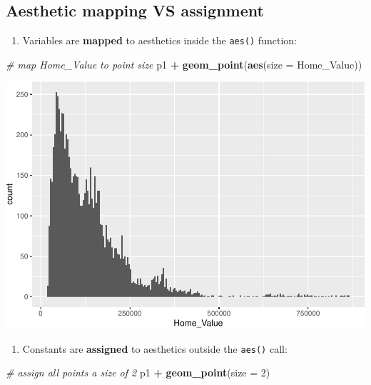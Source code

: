 \documentclass[
]{book}
\newenvironment{Shaded}{\begin{snugshade}}{\end{snugshade}}
\newcommand{\CommentTok}[1]{\textcolor[rgb]{0.56,0.35,0.01}{\textit{#1}}}
\newcommand{\DataTypeTok}[1]{\textcolor[rgb]{0.13,0.29,0.53}{#1}}
\newcommand{\DecValTok}[1]{\textcolor[rgb]{0.00,0.00,0.81}{#1}}
\newcommand{\KeywordTok}[1]{\textcolor[rgb]{0.13,0.29,0.53}{\textbf{#1}}}
\newcommand{\NormalTok}[1]{#1}
\newcommand{\OperatorTok}[1]{\textcolor[rgb]{0.81,0.36,0.00}{\textbf{#1}}}
\newcommand{\StringTok}[1]{\textcolor[rgb]{0.31,0.60,0.02}{#1}}
\providecommand{\tightlist}{%
  \setlength{\itemsep}{0pt}\setlength{\parskip}{0pt}}
\begin{document}
\hypertarget{aesthetic-mapping-vs-assignment}{%
\subsection{Aesthetic mapping VS assignment}\label{aesthetic-mapping-vs-assignment}}

\begin{enumerate}
\def\labelenumi{\arabic{enumi}.}
\tightlist
\item
  Variables are \textbf{mapped} to aesthetics inside the \texttt{aes()} function:
\end{enumerate}

\begin{Shaded}
\begin{Highlighting}[]
\CommentTok{\# map \textasciigrave{}Home\_Value\textasciigrave{} to point size}
\NormalTok{p1 }\OperatorTok{+}
\StringTok{  }\KeywordTok{geom\_point}\NormalTok{(}\KeywordTok{aes}\NormalTok{(}\DataTypeTok{size =}\NormalTok{ Home\_Value))}
\end{Highlighting}
\end{Shaded}

\includegraphics{R/Rgraphics/figures/unnamed-chunk-164-1.pdf}

\begin{enumerate}
\def\labelenumi{\arabic{enumi}.}
\setcounter{enumi}{1}
\tightlist
\item
  Constants are \textbf{assigned} to aesthetics outside the \texttt{aes()} call:
\end{enumerate}

\begin{Shaded}
\begin{Highlighting}[]
\CommentTok{\# assign all points a size of 2}
\NormalTok{p1 }\OperatorTok{+}
\StringTok{  }\KeywordTok{geom\_point}\NormalTok{(}\DataTypeTok{size =} \DecValTok{2}\NormalTok{)}
\end{Highlighting}
\end{Shaded}
\end{document}

